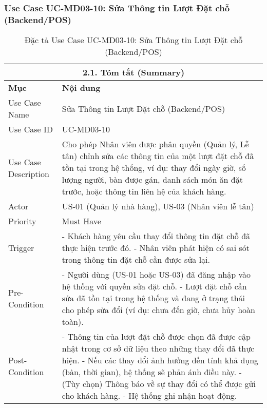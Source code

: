 \subsubsection{Use Case UC-MD03-10: Sửa Thông tin Lượt Đặt chỗ (Backend/POS)}
\begin{longtable}{|m{4cm}|p{11cm}|}
\caption{Đặc tả Use Case UC-MD03-10: Sửa Thông tin Lượt Đặt chỗ (Backend/POS)} \label{tab:uc_md03_10_revised_v3} \\
\hline
\multicolumn{2}{|c|}{\textbf{2.1. Tóm tắt (Summary)}} \\
\hline
\textbf{Mục} & \textbf{Nội dung} \\
\hline
\endhead %
\hline
\endfoot %
\hline
\endlastfoot %
Use Case Name & Sửa Thông tin Lượt Đặt chỗ (Backend/POS) \\
\hline
Use Case ID & UC-MD03-10 \\
\hline
Use Case Description & Cho phép Nhân viên được phân quyền (Quản lý, Lễ tân) chỉnh sửa các thông tin của một lượt đặt chỗ đã tồn tại trong hệ thống, ví dụ: thay đổi ngày giờ, số lượng người, bàn được gán, danh sách món ăn đặt trước, hoặc thông tin liên hệ của khách hàng. \\
\hline
Actor & US-01 (Quản lý nhà hàng), US-03 (Nhân viên lễ tân) \\
\hline
Priority & Must Have \\
\hline
Trigger & - Khách hàng yêu cầu thay đổi thông tin đặt chỗ đã thực hiện trước đó. \newline - Nhân viên phát hiện có sai sót trong thông tin đặt chỗ cần được sửa lại. \\
\hline
Pre-Condition & - Người dùng (US-01 hoặc US-03) đã đăng nhập vào hệ thống với quyền sửa đặt chỗ. \newline - Lượt đặt chỗ cần sửa đã tồn tại trong hệ thống và đang ở trạng thái cho phép sửa đổi (ví dụ: chưa đến giờ, chưa hủy hoàn toàn). \\
\hline
Post-Condition & - Thông tin của lượt đặt chỗ được chọn đã được cập nhật trong cơ sở dữ liệu theo những thay đổi đã thực hiện. \newline - Nếu các thay đổi ảnh hưởng đến tính khả dụng (bàn, thời gian), hệ thống sẽ phản ánh điều này. \newline - (Tùy chọn) Thông báo về sự thay đổi có thể được gửi cho khách hàng. \newline - Hệ thống ghi nhận hoạt động. \\
\hline

\end{longtable}
